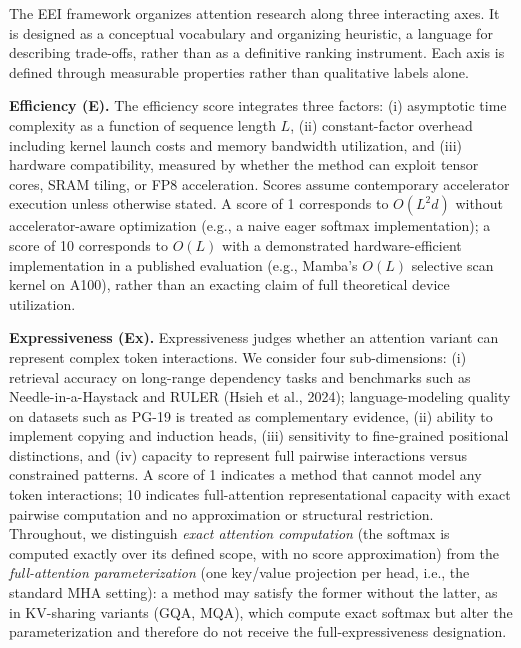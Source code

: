 \documentclass[10pt,twocolumn]{article}
\begin{document}
The EEI framework organizes attention research along three interacting axes. It is designed as a conceptual vocabulary and organizing heuristic, a language for describing trade-offs, rather than as a definitive ranking instrument. Each axis is defined through measurable properties rather than qualitative labels alone.

\textbf{Efficiency (E).} The efficiency score integrates three factors: (i) asymptotic time complexity as a function of sequence length $L$, (ii) constant-factor overhead including kernel launch costs and memory bandwidth utilization, and (iii) hardware compatibility, measured by whether the method can exploit tensor cores, SRAM tiling, or FP8 acceleration. Scores assume contemporary accelerator execution unless otherwise stated. A score of 1 corresponds to $O(L^2 d)$ without accelerator-aware optimization (e.g., a naive eager softmax implementation); a score of 10 corresponds to $O(L)$ with a demonstrated hardware-efficient implementation in a published evaluation (e.g., Mamba's $O(L)$ selective scan kernel on A100), rather than an exacting claim of full theoretical device utilization.

\textbf{Expressiveness (Ex).} Expressiveness judges whether an attention variant can represent complex token interactions. We consider four sub-dimensions: (i) retrieval accuracy on long-range dependency tasks and benchmarks such as Needle-in-a-Haystack and RULER (Hsieh et al., 2024); language-modeling quality on datasets such as PG-19 is treated as complementary evidence, (ii) ability to implement copying and induction heads, (iii) sensitivity to fine-grained positional distinctions, and (iv) capacity to represent full pairwise interactions versus constrained patterns. A score of 1 indicates a method that cannot model any token interactions; 10 indicates full-attention representational capacity with exact pairwise computation and no approximation or structural restriction. Throughout, we distinguish \emph{exact attention computation} (the softmax is computed exactly over its defined scope, with no score approximation) from the \emph{full-attention parameterization} (one key/value projection per head, i.e., the standard MHA setting): a method may satisfy the former without the latter, as in KV-sharing variants (GQA, MQA), which compute exact softmax but alter the parameterization and therefore do not receive the full-expressiveness designation.
\end{document}
